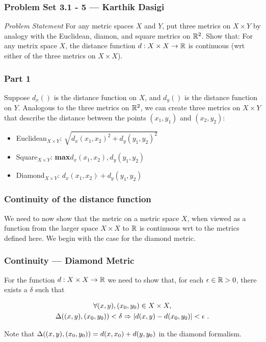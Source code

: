 
\begin{frame}
    \frametitle{Problem Set 3.1 - 5 --- Karthik Dasigi}
    \emph{Problem Statement}
    For any metric spaces \(X\) and \(Y\), put three metrics on \(X \times Y\)
    by analogy with the Euclidean, diamon, and square metrics on \(\mathbb{R}^2\).
    Show that: For any metrix space \(X\), the distance function \(d: X \times X
    \to \mathbb{R}\) is continuous (wrt either of the three metrics on \(X \times
    X\)).
\end{frame}

\begin{frame}
    \frametitle{Part 1}

    Suppose \(d_x()\) is the distance function on \(X\), and \(d_y()\) is the distance function on \(Y\).
    Analogous to the three metrics on \(\mathbb{R}^2\), we can create three metrics on \(X\times Y\) that describe the distance between the points \((x_1, y_1)\) and \((x_2, y_2)\):
    \begin{itemize}
        \item Euclidean\(_{X\times Y}\): \(\sqrt{d_x(x_1, x_2)^2 + d_y(y_1, y_2)^2}\)
        \item Square\(_{X\times Y}\): \textbf{max}{\(d_x(x_1, x_2) , d_y(y_1, y_2)\)}
        \item Diamond\(_{X\times Y}\): \(d_x(x_1, x_2) + d_y(y_1, y_2)\)
    \end{itemize}

\end{frame}

\begin{frame}
    \frametitle{Continuity of the distance function}

    We need to now show that the metric on a metric space \(X\), when viewed as
    a function from the larger space \(X\times X\) to \(\mathbb{R}\) is continuous
    wrt to the metrics defined here. \pause We begin with the case for the
    diamond metric.

\end{frame}

\begin{frame}
    \frametitle{Continuity --- Diamond Metric}

    For the function \(d: X\times X \to \mathbb{R}\) we need to show that, for each
    \(\epsilon \in \mathbb{R} > 0\), there exists a \(\delta\) such that 

    \begin{gather}
        \forall (x, y), (x_0, y_0) \in X\times X,\nonumber\\
        \Delta((x, y), (x_0, y_0)) < \delta \Rightarrow |d(x, y) - d(x_0, y_0)| < \epsilon~.
    \end{gather}

    Note that \(\Delta((x, y), (x_0, y_0)) = d(x, x_0) + d(y, y_0)\)
    in the diamond formalism.

    
\end{frame}

